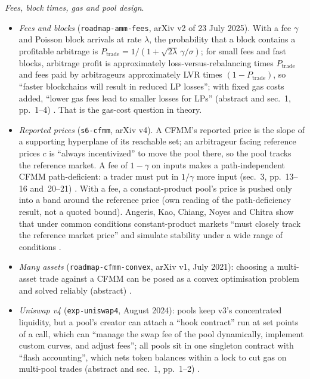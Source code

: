 \begin{qfdefinition}
\emph{Fees, block times, gas and pool design}.
\begin{itemize}
\item \emph{Fees and blocks} (\nolinkurl{roadmap-amm-fees}, arXiv v2 of 23 July 2025). With a fee $\gamma$ and Poisson block arrivals at rate $\lambda$, the probability that a block contains a profitable arbitrage is $P_{\mathrm{trade}}=1/(1+\sqrt{2\lambda}\,\gamma/\sigma)$; for small fees and fast blocks, arbitrage profit is approximately loss-versus-rebalancing times $P_{\mathrm{trade}}$ and fees paid by arbitrageurs approximately LVR times $(1-P_{\mathrm{trade}})$, so ``faster blockchains will result in reduced LP losses''; with fixed gas costs added, ``lower gas fees lead to smaller losses for LPs'' (abstract and sec.~1, pp.~1--4) \citep[arXiv v2, abstract and sec.~1, pp.~1--4]{roadmap-amm-fees}. That is the gas-cost question in theory.
\item \emph{Reported prices} (\nolinkurl{s6-cfmm}, arXiv v4). A CFMM's reported price is the slope of a supporting hyperplane of its reachable set; an arbitrageur facing reference prices $c$ is ``always incentivized'' to move the pool there, so the pool tracks the reference market. A fee of $1-\gamma$ on inputs makes a path-independent CFMM path-deficient: a trader must put in $1/\gamma$ more input (sec.~3, pp.~13--16 and~20--21) \citep[arXiv v4, sec.~3, pp.~13--21]{s6-cfmm}. With a fee, a constant-product pool's price is pushed only into a band around the reference price (own reading of the path-deficiency result, not a quoted bound). Angeris, Kao, Chiang, Noyes and Chitra show that under common conditions constant-product markets ``must closely track the reference market price'' and simulate stability under a wide range of conditions \citep[arXiv v7, abstract]{s11-r12}.
\item \emph{Many assets} (\nolinkurl{roadmap-cfmm-convex}, arXiv v1, July 2021): choosing a multi-asset trade against a CFMM can be posed as a convex optimisation problem and solved reliably (abstract) \citep[arXiv v1, abstract and sec.~1]{roadmap-cfmm-convex}.
\item \emph{Uniswap v4} (\nolinkurl{exp-uniswap4}, August 2024): pools keep v3's concentrated liquidity, but a pool's creator can attach a ``hook contract'' run at set points of a call, which can ``manage the swap fee of the pool dynamically, implement custom curves, and adjust fees''; all pools sit in one singleton contract with ``flash accounting'', which nets token balances within a lock to cut gas on multi-pool trades (abstract and sec.~1, pp.~1--2) \citep[whitepaper, August 2024, pp.~1--2]{exp-uniswap4}.

\end{itemize}
\end{qfdefinition}
